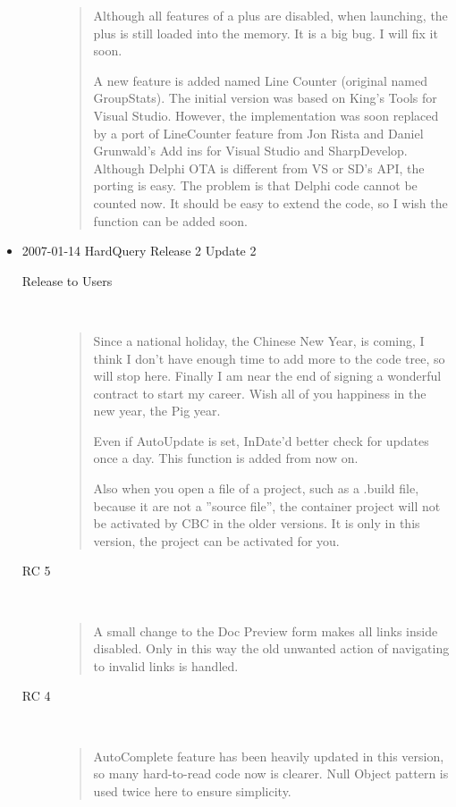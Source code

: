 \begin{itemize}
\begin{description}
\begin{quotation}
	  Although all features of a plus are disabled, when launching, the plus is
	  still loaded into the memory. It is a big bug. I will fix it soon.

	  A new feature is added named Line Counter (original named GroupStats). The
	  initial version was based on King's Tools for Visual Studio. However, the
	  implementation was soon replaced by a port of LineCounter feature from Jon
	  Rista and Daniel Grunwald's Add ins for Visual Studio and SharpDevelop.
	  Although Delphi OTA is different from VS or SD's API, the porting is easy.
	  The problem is that Delphi code cannot be counted now. It should be easy to
	  extend the code, so I wish the function can be added soon.
\end{quotation}

\end{description}
  \item 2007-01-14 HardQuery Release 2 Update 2
  \begin{description}

    \item[Release to Users] \
    \begin{quotation}
      Since a national holiday, the Chinese New Year, is coming, I think I don't have
      enough time to add more to the code tree, so will stop here. Finally I am near
      the end of signing a wonderful contract to start my career. Wish all of you
      happiness in the new year, the Pig year.

      Even if AutoUpdate is set, InDate'd better check for updates once a day. This
      function is added from now on.

      Also when you open a file of a project, such as a .build file, because it are
      not a ''source file'', the container project will not be activated by CBC in
      the older versions. It is only in this version, the project can be activated
      for you.
    \end{quotation}
    \item[RC 5] \
    \begin{quotation}
      A small change to the Doc Preview form makes all links inside disabled. Only in
      this way the old unwanted action of navigating to invalid links is handled.
    \end{quotation}
    \item[RC 4] \
    \begin{quotation}
      AutoComplete feature has been heavily updated in this version, so many
      hard-to-read code now is clearer. Null Object pattern is used twice here to
      ensure simplicity.
    \end{quotation}


\end{description}
\end{itemize}
